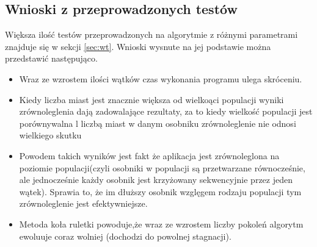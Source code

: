 \documentclass[10pt,a4paper]{article}
\begin{document}
\subsection{Wnioski z przeprowadzonych testów}
Większa ilość testów przeprowadzonych na algorytmie z różnymi parametrami znajduje się w sekcji \ref{sec:wt}. Wnioski wysnute na jej podstawie można przedstawić następująco. 
\begin{itemize}
\item Wraz ze wzrostem ilości wątków czas wykonania programu ulega skróceniu.
\item Kiedy liczba miast jest znacznie większa od wielkoąci populacji wyniki zrównoleglenia dają zadowalające rezultaty, za to kiedy wielkość populacji jest porównywalna l liczbą miast w danym osobniku zrównoleglenie nie odnosi wielkiego skutku
\item Powodem takich wyników jest fakt że aplikacja jest zrównoleglona na poziomie populacji(czyli osobniki w populacji są przetwarzane równocześnie, ale jednocześnie każdy osobnik jest krzyżowany sekwencyjnie przez jeden wątek). Sprawia to, że im dłuższy osobnik wzglęgem rodzaju populacji tym zrównoleglenie jest efektywniejsze.
\item Metoda koła ruletki powoduje,że wraz ze wzrostem liczby pokoleń algorytm ewoluuje coraz wolniej (dochodzi do powolnej stagnacji).
\end{itemize}
\end{document}
